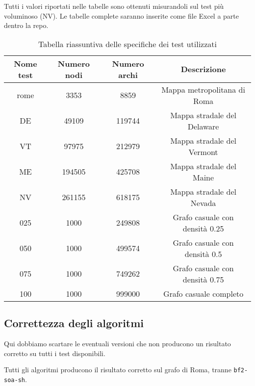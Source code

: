 \documentclass[a4paper]{article}
\begin{document}
	Tutti i valori riportati nelle tabelle sono ottenuti misurandoli sul test più voluminoso (NV). Le tabelle complete saranno inserite come file Excel a parte dentro la repo.
	\begin{table}[!ht]
		\centering
		\begin{tabular}{|c|c|c|c|}
			\hline
			\textbf{Nome test} & \textbf{Numero nodi} & \textbf{Numero archi} & \textbf{Descrizione} \\ \hline
			rome & 3353 & 8859 & Mappa metropolitana di Roma \\ \hline
			DE & 49109 & 119744 & Mappa stradale del Delaware \\ \hline
			VT & 97975 & 212979 & Mappa stradale del Vermont \\ \hline
			ME & 194505 & 425708 & Mappa stradale del Maine \\ \hline
			NV & 261155 & 618175 & Mappa stradale del Nevada \\ \hline
			025 & 1000 & 249808 & Grafo casuale con densità 0.25 \\ \hline
			050 & 1000 & 499574 & Grafo casuale con densità 0.5 \\ \hline
			075 & 1000 & 749262 & Grafo casuale con densità 0.75 \\ \hline
			100 & 1000 & 999000 & Grafo casuale completo \\ \hline
		\end{tabular}
		\label{tab:riassunto_test}
		\caption{Tabella riassuntiva delle specifiche dei test utilizzati}
	\end{table}

	\subsection{Correttezza degli algoritmi}
	Qui dobbiamo scartare le eventuali versioni che non producono un risultato corretto su tutti i test disponibili.
	
	Tutti gli algoritmi producono il risultato corretto sul grafo di Roma, tranne \texttt{bf2-soa-sh}.
	
\end{document}

